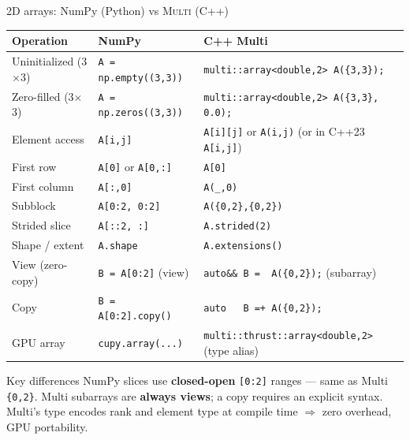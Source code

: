 \documentclass[t,aspectratio=169,handout]{beamer}
\begin{document}
\begin{frame}[label=numpy-comparison,fragile]{2D arrays: NumPy (Python) vs \textsc{Multi} (C++)}
\small
\begin{tabular}{@{}lll@{}}
\hline
\textbf{Operation}         & \textbf{NumPy}                           & \textbf{C++ Multi} \\
\hline
Uninitialized (3$\times$3) & \lstinline|A = np.empty((3,3))|          & \lstinline|multi::array<double,2> A({3,3});| \\
Zero-filled (3$\times$3)   & \lstinline|A = np.zeros((3,3))|          & \lstinline|multi::array<double,2> A({3,3}, 0.0);| \\
Element access             & \lstinline|A[i,j]|                       & \lstinline|A[i][j]| or \lstinline|A(i,j)| (or in C++23 \lstinline|A[i,j]|) \\
First row                  & \lstinline|A[0]| or \lstinline|A[0,:]|   & \lstinline|A[0]| \\
First column               & \lstinline|A[:,0]|                       & \lstinline|A(_,0)| \\
Subblock                   & \lstinline|A[0:2, 0:2]|                  & \lstinline|A({0,2},{0,2})| \\
Strided slice              & \lstinline|A[::2, :]|                    & \lstinline|A.strided(2)| \\
Shape / extent             & \lstinline|A.shape|                      & \lstinline|A.extensions()| \\
View (zero-copy)           & \lstinline|B = A[0:2]| (view)            & \lstinline|auto&& B =  A({0,2});| (subarray) \\
Copy                       & \lstinline|B = A[0:2].copy()|            & \lstinline|auto   B =+ A({0,2});| \\
GPU array                  & \lstinline|cupy.array(...)|              & \lstinline|multi::thrust::array<double,2>| (type alias) \\
\hline
\end{tabular}

\vspace{0.4em}
\begin{alertblock}{Key differences}
  NumPy slices use \textbf{closed-open} \lstinline|[0:2]| ranges --- same as Multi \lstinline|{0,2}|.
  Multi subarrays are \textbf{always views}; a copy requires an explicit syntax.
  Multi's type encodes rank and element type at compile time $\Rightarrow$ zero overhead, GPU portability.
\end{alertblock}
\end{frame}
\end{document}
